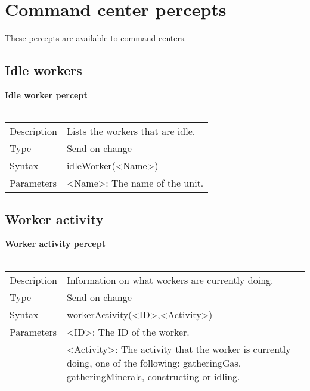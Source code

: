 \documentclass[english,11pt]{report}
\begin{document}
\newpage
\section{Command center percepts}
These percepts are available to command centers.
\subsection{Idle workers}
\textbf{Idle worker percept}\\
\\
\begin{tabularx}{\textwidth}{lX}
 Description & Lists the workers that are idle. \\
 Type & Send on change \\
 Syntax & idleWorker(<Name>) \\
 Parameters &   <Name>: The name of the unit.
\end{tabularx}

\subsection{Worker activity}
\textbf{Worker activity percept}\\
\\
\begin{tabularx}{\textwidth}{lX}
 Description & Information on what workers are currently doing. \\
 Type & Send on change \\
 Syntax & workerActivity(<ID>,<Activity>) \\
 Parameters &   <ID>: The ID of the worker.\\
            &   <Activity>: The activity that the worker is currently doing, one of the following: gatheringGas, gatheringMinerals, constructing or idling.
\end{tabularx}
\end{document}
